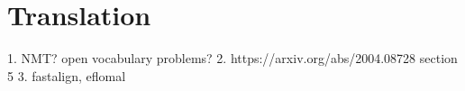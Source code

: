 %
%

\chapter{Translation}\label{sec:translation}

	1. NMT? open vocabulary problems?
	2. https://arxiv.org/abs/2004.08728 section 5
 	3. fastalign, eflomal
